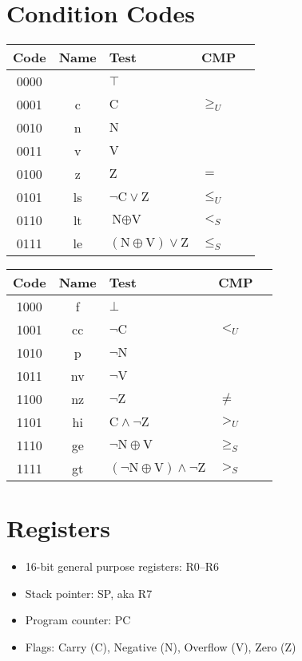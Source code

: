 \documentclass[11pt]{book}
\let\geq\geqslant
\let\leq\leqslant
\begin{document}
\section*{Condition Codes}\thispagestyle{empty}\pagestyle{empty}
\begin{center}
\begin{tabular}{cclll}
  \toprule
  Code&Name&Test&CMP\\\midrule
  0000&&\(\top\)\\
  0001&c&\(\text{C}\)&\(\geq_U\)\\
  0010&n&\(\text{N}\)\\
  0011&v&\(\text{V}\)\\
  0100&z&\(\text{Z}\)&\(=\)\\
  0101&ls&\(\neg\text{C}\vee\text{Z}\)&\(\leq_U\)\\
  0110&lt&\(\text{N}\oplus\text{V}\)&\(<_S\)\\
  0111&le&\((\text{N}\oplus\text{V})\vee\text{Z}\)
  &\(\leq_S\)\\
  \bottomrule
\end{tabular}\qquad
\begin{tabular}{cclll}
  \toprule
  Code&Name&Test&CMP\\\midrule
  1000&f&\(\bot\)\\
  1001&cc&\(\neg\text{C}\)&\(<_U\)\\
  1010&p&\(\neg\text{N}\)\\
  1011&nv&\(\neg\text{V}\)\\
  1100&nz&\(\neg\text{Z}\)&\(\neq\)\\
  1101&hi&\(\text{C}\wedge\neg\text{Z}\)&\(>_U\)\\
  1110&ge&\(\neg\text{N}\oplus\text{V}\)&\(\geq_S\)\\
  1111&gt&\((\neg\text{N}\oplus\text{V})\wedge\neg\text{Z}\)
  &\(>_S\)\\
  \bottomrule
\end{tabular}
\end{center}

\section*{Registers}
\begin{itemize}
\item 16-bit general purpose registers: R0--R6
\item Stack pointer: SP, aka R7
\item Program counter: PC
\item Flags: Carry (C), Negative (N), Overflow (V), Zero (Z)
\end{itemize}
\end{document}

